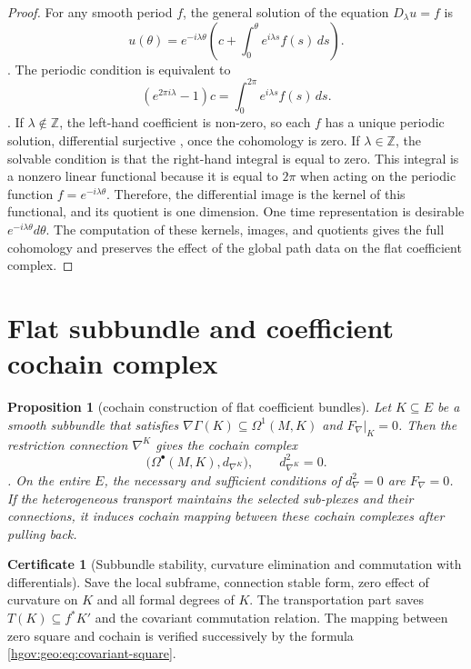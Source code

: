 \documentclass[12pt,a4paper,openany,notitlepage]{report}
\theoremstyle{plain}
\newtheorem{proposition}[theorem]{Proposition}
\theoremstyle{definition}
\newtheorem*{certificate}{Certificate}
\theoremstyle{remark}
\begin{document}
\begin{CJK*}
\begin{proof}
For any smooth period $f$, the general solution of the equation $D_\lambda u=f$ is \[
u(\theta)=e^{-i\lambda\theta}
\left(c+\int_0^\theta e^{i\lambda s}f(s)\,ds\right).
\]. The periodic condition is equivalent to \[
(e^{2\pi i\lambda}-1)c
=\int_0^{2\pi}e^{i\lambda s}f(s)\,ds.
\]. If $\lambda\notin\mathbb Z$, the left-hand coefficient is non-zero, so each $f$ has a unique periodic solution, differential surjective , once the cohomology is zero. If $\lambda\in\mathbb Z$, the solvable condition is that the right-hand integral is equal to zero. This integral is a nonzero linear functional because it is equal to $2\pi$ when acting on the periodic function $f=e^{-i\lambda\theta}$. Therefore, the differential image is the kernel of this functional, and its quotient is one dimension. One time representation is desirable $e^{-i\lambda\theta}d\theta$. The computation of these kernels, images, and quotients gives the full cohomology and preserves the effect of the global path data on the flat coefficient complex.\end{proof}


\section { Flat subbundle and coefficient cochain complex }\label{hgov:geo:complexes}


\begin{proposition}
[cochain construction of flat coefficient bundles]\label{hgov:geo:prop:flat-complex}
Let $K\subseteq E$ be a smooth subbundle that satisfies $\nabla\Gamma(K)\subseteq\Omega^1(M,K)$ and $F_\nabla|_K=0$. Then the restriction connection $\nabla^K$ gives the cochain complex \[
\bigl(\Omega^\bullet(M,K),d_{\nabla^K}\bigr),
\qquad d_{\nabla^K}^2=0.
\]. On the entire $E$, the necessary and sufficient conditions of $d_\nabla^2=0$ are $F_\nabla=0$. If the heterogeneous transport maintains the selected sub-plexes and their connections, it induces cochain mapping between these cochain complexes after pulling back.\end{proposition}


\begin{certificate}
[Subbundle stability, curvature elimination and commutation with differentials]Save the local subframe, connection stable form, zero effect of curvature on $K$ and all formal degrees of $K$. The transportation part saves $T(K)\subseteq f^*K'$ and the covariant commutation relation. The mapping between zero square and cochain is verified successively by the formula ~ \eqref{hgov:geo:eq:covariant-square}.\end{certificate}



\end{CJK*}
\end{document}
